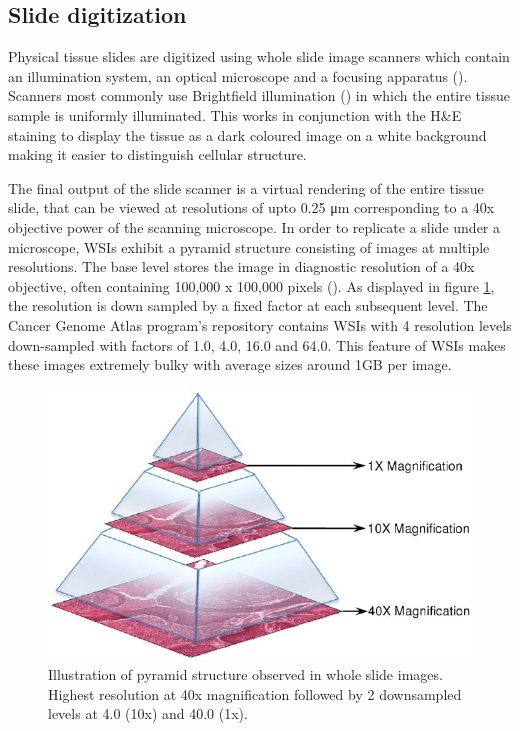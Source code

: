 \documentclass{l4proj}
\begin{document}
\subsection{Slide digitization}
Physical tissue slides are digitized using whole slide image scanners which contain an illumination system, an optical microscope and a focusing apparatus (\textit{\cite{ghaznavi2013digital}}). Scanners most commonly use Brightfield illumination (\textit{\cite{kino1996confocal}}) in which the entire tissue sample is uniformly illuminated. This works in conjunction with the H\&E staining to display the tissue as a dark coloured image on a white background making it easier to distinguish cellular structure. 

The final output of the slide scanner is a virtual rendering of the entire tissue slide, that can be viewed at resolutions of upto 0.25 \si{\micro\meter} corresponding to a 40x objective power of the scanning microscope. In order to replicate a slide under a microscope, WSIs exhibit a pyramid structure consisting of images at multiple resolutions. The base level stores the image in diagnostic resolution of a 40x objective, often containing 100,000 x 100,000 pixels (\textit{\cite{wang2012managing}}). As displayed in figure \ref{fig:pyramid-fig}, the resolution is down sampled by a fixed factor at each subsequent level. The Cancer Genome Atlas program's repository contains WSIs with 4 resolution levels down-sampled with factors of 1.0, 4.0, 16.0 and 64.0. This feature of WSIs makes these images extremely bulky with average sizes around 1GB per image. 

\begin{figure}[h]
\centering
\includegraphics[scale=0.5]{images/digital-slide-stored-in-a-pyramid-structure.png}
\caption{Illustration of pyramid structure observed in whole slide images. Highest resolution at 40x magnification followed by 2 downsampled levels at 4.0 (10x) and 40.0 (1x).}
\label{fig:pyramid-fig}
\end{figure}
\end{document}
